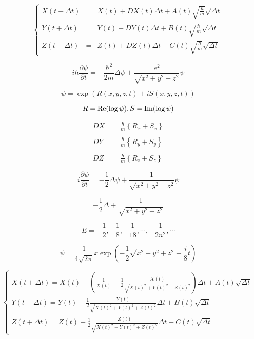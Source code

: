 $$
\left\{
\begin{array}{lll}
X(t+\varDelta t)&=&X(t)+DX(t)\varDelta t+A(t)\sqrt{\frac{\hbar}{m}}\sqrt{\varDelta t} \\
Y(t+\varDelta t)&=&Y(t)+DY(t)\varDelta t+B(t)\sqrt{\frac{\hbar}{m}}\sqrt{\varDelta t} \\
Z(t+\varDelta t)&=&Z(t)+DZ(t)\varDelta t+C(t)\sqrt{\frac{\hbar}{m}}\sqrt{\varDelta t}
\end{array}
\right.
$$

$$
i h \frac{\partial \psi}{\partial t}=-\frac{\hbar^2}{2m}\varDelta\psi+\frac{e^2}{\sqrt{x^2+y^2+z^2}}\psi
$$

$$
\psi=\exp(R(x,y,z,t)+iS(x,y,z,t))
$$

$$
R={\rm Re}(\log\psi), S={\rm Im}(\log\psi)
$$

$$
\begin{array}{ll}
DX&=\frac{\hbar}{m}\left\{R_{x}+S_{x}\right\} \\
\\
DY&=\frac{\hbar}{m}\left\{R_{y}+S_{y}\right\} \\
\\
DZ&=\frac{\hbar}{m}\left\{R_{z}+S_{z}\right\} 
\end{array}
$$

$$
i \frac{\partial \psi}{\partial t}=-\frac{1}{2}\varDelta\psi+\frac{1}{\sqrt{x^2+y^2+z^2}}\psi
$$

$$
-\frac{1}{2}\varDelta+\frac{1}{\sqrt{x^2+y^2+z^2}}
$$

$$
E=-\frac{1}{2},-\frac{1}{8},-\frac{1}{18},\cdots,-\frac{1}{2n^{2}},\cdots
$$

$$
\psi=\frac{1}{4\sqrt{2\pi}}x\exp\left(-\frac{1}{2}\sqrt{x^2+y^{2}+z^{2}}+\frac{i}{8}t\right)
$$

$$
\left\{
\begin{array}{l}
X(t+\Delta t)=\displaystyle X(t)+\left(\frac{1}{X(t)}-\frac{1}{2}\frac{X(t)}{\sqrt{X(t)^{2}+Y(t)^{2}+Z(t)^{2}}}\right)\Delta t+A(t)\sqrt{\Delta t} \\
Y(t+\Delta t)=\displaystyle Y(t)-\frac{1}{2}\frac{Y(t)}{\sqrt{X(t)^{2}+Y(t)^{2}+Z(t)^{2}}}\Delta t+B(t)\sqrt{\Delta t} \\
Z(t+\Delta t)=\displaystyle Z(t)-\frac{1}{2}\frac{Z(t)}{\sqrt{X(t)^{2}+Y(t)^{2}+Z(t)^{2}}}\Delta t+C(t)\sqrt{\Delta t}\end{array}
\right.
$$

